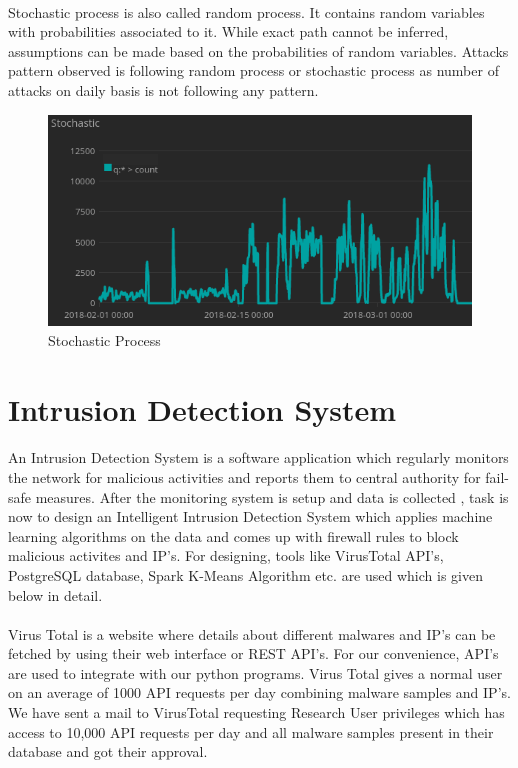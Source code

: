 \documentclass{report}
\begin{document}
\paragraph{}
Stochastic process is also called random process. It contains random variables with probabilities associated to it. While exact path cannot be inferred, assumptions can be made based on the probabilities of random variables. Attacks pattern observed is following random process or stochastic process as number of attacks on daily basis is not following any pattern.

\begin{figure}[H]
\centering
\caption{Stochastic Process}
\includegraphics[scale=0.7]{Stochastic_Process}
\end{figure}

\section{Intrusion Detection System}
\paragraph{}
An Intrusion Detection System is a software application which regularly monitors the network for malicious activities and reports them to central authority for fail-safe measures. After the monitoring system is setup and data is collected , task is now to design an Intelligent Intrusion Detection System which applies machine learning algorithms on the data and comes up with firewall rules to block malicious activites and IP's. For designing, tools like VirusTotal API's, PostgreSQL database, Spark K-Means Algorithm etc. are used which is given below in detail.

\paragraph{}
Virus Total is a website where details about different malwares and IP's can be fetched by using their web interface or REST API's. For our convenience, API's are used to integrate with our python programs. Virus Total gives a normal user on an average of 1000 API requests per day combining malware samples and IP's. We have sent a mail to VirusTotal requesting Research User  privileges which has access to 10,000 API requests per day and all malware samples present in their database and got their approval.
\end{document}
